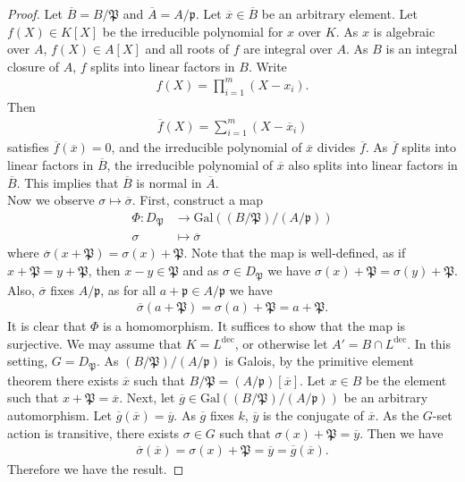 \documentclass[12pt]{article}
\theoremstyle{plain}
\theoremstyle{remark}
\theoremstyle{definition}
\begin{document}
\begin{proof}
    Let $\overline{B}=B/\mathfrak{P}$ and $\overline{A}=A/\mathfrak{p}$. Let $\overline{x}\in\overline{B}$ be an arbitrary element. Let $f(X)\in K[X]$ be the irreducible polynomial for $x$ over $K$. As $x$ is algebraic over $A$, $f(X)\in A[X]$ and all roots of $f$ are integral over $A$. As $B$ is an integral closure of $A$, $f$ splits into linear factors in $B$. Write
    \begin{align*}
        f(X)=\prod_{i=1}^m(X-x_i).
    \end{align*}
    Then
    \begin{align*}
        \overline{f}(X)=\sum_{i=1}^m (X-\overline{x}_i)
    \end{align*}
    satisfies $\overline{f}(\overline{x})=0$, and the irreducible polynomial of $\overline{x}$ divides $\overline{f}$. As $\overline{f}$ splits into linear factors in $\overline{B}$, the irreducible polynomial of $\overline{x}$ also splits into linear factors in $\overline{B}$. This implies that $\overline{B}$ is normal in $\overline{A}$. \\
    Now we observe $\sigma\mapsto \overline{\sigma}$. First, construct a map
    \begin{align*}
        \Phi:D_{\mathfrak{P}} &\to \mathrm{Gal}((B/\mathfrak{P})/(A/\mathfrak{p})) \\
        \sigma &\mapsto \overline{\sigma}
    \end{align*}
    where $\overline{\sigma}(x+\mathfrak{P})=\sigma(x)+\mathfrak{P}$. Note that the map is well-defined, as if $x+\mathfrak{P}=y+\mathfrak{P}$, then $x-y\in\mathfrak{P}$ and as $\sigma\in D_\mathfrak{P}$ we have $\sigma(x)+\mathfrak{P}=\sigma(y)+\mathfrak{P}$. Also, $\overline{\sigma}$ fixes $A/\mathfrak{p}$, as for all $a+\mathfrak{p}\in A/\mathfrak{p}$ we have
    \begin{align*}
        \overline{\sigma}(a+\mathfrak{P})=\sigma(a)+\mathfrak{P}=a+\mathfrak{P}.
    \end{align*}
    It is clear that $\Phi$ is a homomorphism. It suffices to show that the map is surjective. We may assume that $K=L^\mathrm{dec}$, or otherwise let $A'=B\cap L^\mathrm{dec}$. In this setting, $G=D_\mathfrak{P}$. As $(B/\mathfrak{P})/(A/\mathfrak{p})$ is Galois, by the primitive element theorem there exists $\overline{x}$ such that $B/\mathfrak{P} = (A/\mathfrak{p})[\overline{x}]$. Let $x\in B$ be the element such that $x+\mathfrak{P}=\overline{x}$. Next, let $\overline{g}\in \mathrm{Gal}((B/\mathfrak{P})/(A/\mathfrak{p}))$ be an arbitrary automorphism. Let $\overline{g}(\overline{x})=\overline{y}$. As $\overline{g}$ fixes $k$, $\overline{y}$ is the conjugate of $\overline{x}$. As the $G$-set action is transitive, there exists $\sigma\in G$ such that $\sigma(x)+\mathfrak{P}=\overline{y}$. Then we have
    \begin{align*}
        \overline{\sigma}(\overline{x}) = \sigma(x)+\mathfrak{P}=\overline{y}=\overline{g}(\overline{x}).
    \end{align*}
    Therefore we have the result.
\end{proof}
\end{document}
